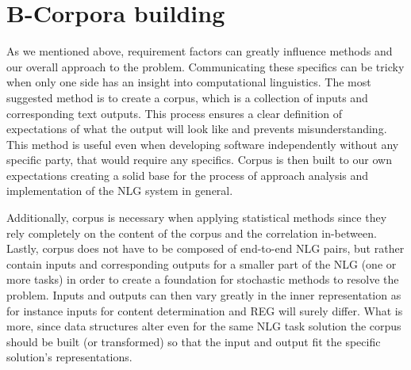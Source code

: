 \section{B-Corpora building}
As we mentioned above, requirement factors can greatly influence methods and our overall approach to the problem. Communicating these specifics can be tricky when only one side has an insight into computational linguistics. The most suggested method is to create a corpus, which is a collection of inputs and corresponding text outputs. This process ensures a clear definition of expectations of what the output will look like and prevents misunderstanding. This method is useful even when developing software independently without any specific party, that would require any specifics. Corpus is then built to our own expectations creating a solid base for the process of approach analysis and implementation of the NLG system in general. 

Additionally, corpus is necessary when applying statistical methods since they rely completely on the content of the corpus and the correlation in-between. Lastly, corpus does not have to be composed of end-to-end NLG pairs, but rather contain inputs and corresponding outputs for a smaller part of the NLG (one or more tasks) in order to create a foundation for stochastic methods to resolve the problem. Inputs and outputs can then vary greatly in the inner representation as for instance inputs for content determination and REG will surely differ. What is more, since data structures  alter even for the same NLG task solution the corpus should be built (or transformed) so that the input and output fit the specific solution's representations.

